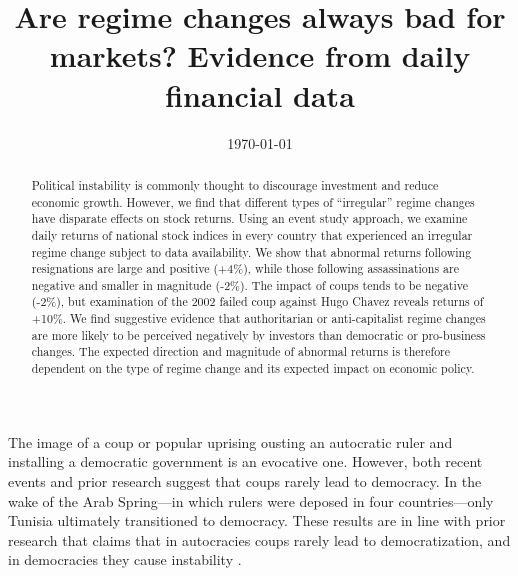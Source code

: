 \documentclass[12pt,final,fleqn]{article}
\theoremstyle{plain}
\begin{document}
\title{\textbf{Are regime changes always bad for markets? Evidence from daily financial data}} 
\date{\today}
\maketitle
\thispagestyle{empty}

\singlespacing
\begin{abstract}
\noindent
Political instability is commonly thought to discourage investment and reduce economic growth. However, we find that different types of ``irregular'' regime changes have disparate effects on stock returns. Using an event study approach, we examine daily returns of national stock indices in every country that experienced an irregular regime change subject to data availability. We show that abnormal returns following resignations are large and positive (+4\%), while those following assassinations are negative and smaller in magnitude (-2\%). The impact of coups tends to be negative (-2\%), but examination of the 2002 failed coup against Hugo Chavez reveals returns of +10\%. We find suggestive evidence that authoritarian or anti-capitalist regime changes are more likely to be perceived negatively by investors than democratic or pro-business changes.  The expected direction and magnitude of abnormal returns is therefore dependent on the type of regime change and its expected impact on economic policy. 


\end{abstract}
\doublespacing

\clearpage
{}

\newpage

The image of a coup or popular uprising ousting an autocratic ruler and installing a democratic government is an evocative one. However, both recent events and prior research suggest that coups rarely lead to democracy. In the wake of the Arab Spring---in which rulers were deposed in four countries---only Tunisia ultimately transitioned to democracy. These results are in line with prior research that claims that in autocracies coups rarely lead to democratization, and in democracies they cause instability \citep{derpanopoulos2015coups, powell2011global, thyne2016coup, varol2011democratic}.
\end{document}
